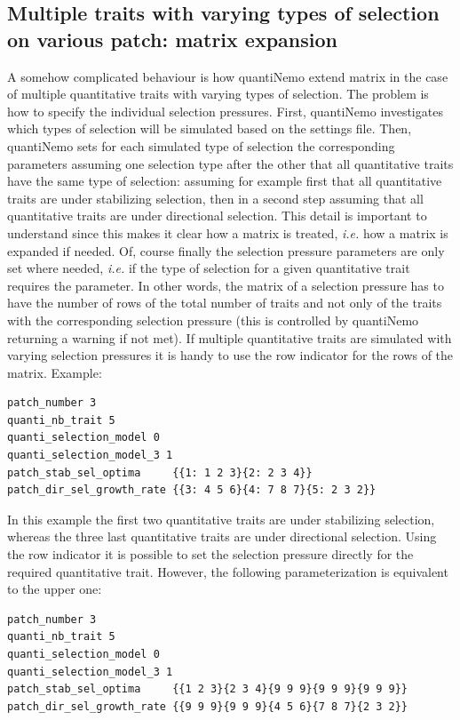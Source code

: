 \documentclass[letterpaper,12pt,oneside]{book}
\begin{document}
\begin{appendices}
\section{Multiple traits with varying types of selection on various patch: matrix expansion}
A somehow complicated behaviour is how quantiNemo extend matrix in the case of multiple quantitative traits with varying types of selection. The problem is how to specify the individual selection pressures. First, quantiNemo investigates which types of selection will be simulated based on the settings file. Then, quantiNemo sets for each simulated type of selection the corresponding parameters assuming one selection type after the other that all quantitative traits have the same type of selection: assuming for example first that all quantitative traits are under stabilizing selection, then in a second step assuming that all quantitative traits are under directional selection. This detail is important to understand since this makes it clear how a matrix is treated, \textit{i.e.} how a matrix is expanded if needed. Of, course finally the selection pressure parameters are only set where needed, \textit{i.e.} if the type of selection for a given quantitative trait requires the parameter. In other words, the matrix of a selection pressure has to have the number of rows of the total number of traits and not only of the traits with the corresponding selection pressure (this is controlled by quantiNemo returning a warning if not met). If multiple quantitative traits are simulated with varying selection pressures it is handy to use the row indicator for the rows of the matrix. Example:
\begin{lstlisting}[frame=single]
patch_number 3
quanti_nb_trait 5 
quanti_selection_model 0    
quanti_selection_model_3 1
patch_stab_sel_optima     {{1: 1 2 3}{2: 2 3 4}}
patch_dir_sel_growth_rate {{3: 4 5 6}{4: 7 8 7}{5: 2 3 2}}
\end{lstlisting}
In this example the first two quantitative traits are under stabilizing selection, whereas the three last quantitative traits are under directional selection. Using the row indicator it is possible to set the selection pressure directly for the required quantitative trait. However, the following parameterization is equivalent to the upper one:
\begin{lstlisting}[frame=single]
patch_number 3
quanti_nb_trait 5 
quanti_selection_model 0    
quanti_selection_model_3 1
patch_stab_sel_optima     {{1 2 3}{2 3 4}{9 9 9}{9 9 9}{9 9 9}}
patch_dir_sel_growth_rate {{9 9 9}{9 9 9}{4 5 6}{7 8 7}{2 3 2}}

\end{lstlisting}
\end{appendices}
\end{document}
